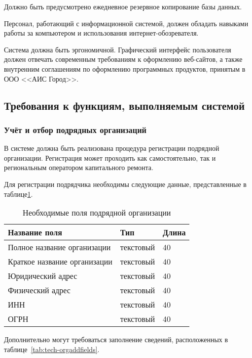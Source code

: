 Должно быть предусмотрено ежедневное резервное копирование базы данных.

Персонал, работающий с информационной системой, должен обладать навыками работы за компьютером и использования интернет-обозревателя.

Система должна быть эргономичной.
Графический интерфейс пользователя должен отвечать современным требованиям к оформлению веб-сайтов, а также внутренним соглашениям по оформлению программных продуктов, принятым в ООО <<АИС Город>>.

\subsection{Требования к функциям, выполняемым системой}

\subsubsection{Учёт и отбор подрядных организаций}

В системе должна быть реализована процедура регистрации подрядной организации.
Регистрация может проходить как самостоятельно, так и региональным оператором капитального ремонта.

Для регистрации подрядчика необходимы следующие данные, представленные в таблице\ref{tab:tech-orgfields}.

\begin{footnotesize}
\begin{longtable}[h]{|p{}|p{}|p{}|}
	\caption{\label{tab:tech-orgfields}Необходимые поля подрядной организации} \\
	\hline
		\textbf{Название поля} & \textbf{Тип} & \textbf{Длина} \\
	\hline \endhead
		Полное название организации & текстовый & 40 \\
	\hline
		Краткое название организации & текстовый & 40 \\
	\hline
		Юридический адрес & текстовый & 40 \\
	\hline
		Физический адрес & текстовый & 40 \\
	\hline
		ИНН & текстовый & 40 \\
	\hline
		ОГРН & текстовый & 40 \\
	\hline
\end{longtable}
\end{footnotesize}

Дополнительно могут требоваться заполнение сведений, расположенных в таблице~\ref{tab:tech-orgaddfields}.

